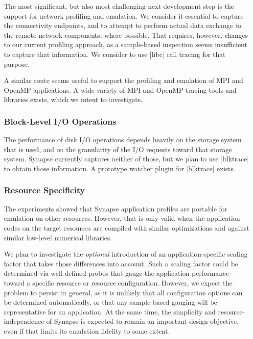\documentclass[10pt, conference, compsocconf]{IEEEtran}
\newcommand{\I}[1]{\textit{#1}\xspace}
\newcommand{\synapse}{Synapse\xspace}
\begin{document}
 The most significant, but also most challenging next development step
 is the support for network profiling and emulation.  We consider it
 essential to capture the connectivity endpoints, and to attempt to
 perform actual data exchange to the remote network components, where
 possible.  That requires, however, changes to our current profiling
 approach, as a sample-based inspection seems insufficient to capture
 that information.  We consider to use |libc| call tracing for that
 purpose.

 A similar route seems useful to support the profiling and emulation
 of MPI and OpenMP applications.  A wide variety of MPI and OpenMP
 tracing tools and libraries exists, which we intent to investigate.


 \subsubsection*{Block-Level I/O Operations}

 The performance of disk I/O operations depends heavily on the
 storage system that is used, and on the granularity of the I/O requests toward
 that storage system.  \synapse currently captures neither of those,
 but we plan to use |blktrace| to obtain those information.  A
 prototype watcher plugin for |blktrace| exists.


 \subsubsection*{Resource Specificity}

 The experiments showed that \synapse application profiles are portable
 for emulation on other resources.  However, that is only valid when
 the application codes on the target resources are compiled with
 similar optimizations and against similar low-level numerical
 libraries.  
 
 We plan to investigate the \I{optional} introduction of an
 application-specific scaling factor that takes those differences into
 account.  Such a scaling factor could be determined via well defined
 probes that gauge the application performance toward a specific
 resource or resource configuration.  However, we expect the problem
 to persist in general, as it is unlikely that all configuration
 options can be determined automatically, or that any sample-based
 gauging will be representative for an application.  At the same time,
 the simplicity and resource-independence of \synapse is expected to
 remain an important design objective, even if that limits its
 emulation fidelity to some extent.
\end{document}
